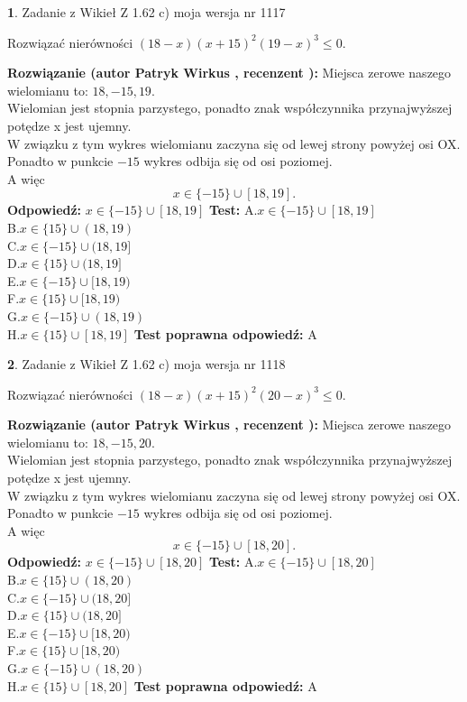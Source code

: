\documentclass[12pt, a4paper]{article}
\theoremstyle{definition} %
\newtheorem{zad}{}
\newcommand{\zadStart}[1]{\begin{zad}#1\newline}
\newcommand{\zadStop}{\end{zad}}
\newcommand{\rozwStart}[2]{\noindent \textbf{Rozwiązanie (autor #1 , recenzent #2): }\newline}
\newcommand{\rozwStop}{\newline}
\newcommand{\odpStart}{\noindent \textbf{Odpowiedź:}\newline}
\newcommand{\odpStop}{\newline}
\newcommand{\testStart}{\noindent \textbf{Test:}\newline}
\newcommand{\testStop}{\newline}
\newcommand{\kluczStart}{\noindent \textbf{Test poprawna odpowiedź:}\newline}
\newcommand{\kluczStop}{\newline}
\begin{document}
\zadStart{Zadanie z Wikieł Z 1.62 c) moja wersja nr 1117}

Rozwiązać nierówności $(18-x)(x+15)^{2}(19-x)^{3}\le0$.
\zadStop
\rozwStart{Patryk Wirkus}{}
Miejsca zerowe naszego wielomianu to: $18, -15, 19$.\\
Wielomian jest stopnia parzystego, ponadto znak współczynnika przy\linebreak najwyższej potędze x jest ujemny.\\ W związku z tym wykres wielomianu zaczyna się od lewej strony powyżej osi OX.\\
Ponadto w punkcie $-15$ wykres odbija się od osi poziomej.\\
A więc $$x \in \{-15\} \cup [18,19].$$
\rozwStop
\odpStart
$x \in \{-15\} \cup [18,19]$
\odpStop
\testStart
A.$x \in \{-15\} \cup [18,19]$\\
B.$x \in \{15\} \cup (18,19)$\\
C.$x \in \{-15\} \cup (18,19]$\\
D.$x \in \{15\} \cup (18,19]$\\
E.$x \in \{-15\} \cup [18,19)$\\
F.$x \in \{15\} \cup [18,19)$\\
G.$x \in \{-15\} \cup (18,19)$\\
H.$x \in \{15\} \cup [18,19]$
\testStop
\kluczStart
A
\kluczStop



\zadStart{Zadanie z Wikieł Z 1.62 c) moja wersja nr 1118}

Rozwiązać nierówności $(18-x)(x+15)^{2}(20-x)^{3}\le0$.
\zadStop
\rozwStart{Patryk Wirkus}{}
Miejsca zerowe naszego wielomianu to: $18, -15, 20$.\\
Wielomian jest stopnia parzystego, ponadto znak współczynnika przy\linebreak najwyższej potędze x jest ujemny.\\ W związku z tym wykres wielomianu zaczyna się od lewej strony powyżej osi OX.\\
Ponadto w punkcie $-15$ wykres odbija się od osi poziomej.\\
A więc $$x \in \{-15\} \cup [18,20].$$
\rozwStop
\odpStart
$x \in \{-15\} \cup [18,20]$
\odpStop
\testStart
A.$x \in \{-15\} \cup [18,20]$\\
B.$x \in \{15\} \cup (18,20)$\\
C.$x \in \{-15\} \cup (18,20]$\\
D.$x \in \{15\} \cup (18,20]$\\
E.$x \in \{-15\} \cup [18,20)$\\
F.$x \in \{15\} \cup [18,20)$\\
G.$x \in \{-15\} \cup (18,20)$\\
H.$x \in \{15\} \cup [18,20]$
\testStop
\kluczStart
A
\kluczStop
\end{document}
